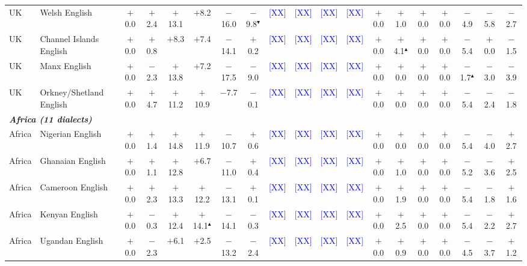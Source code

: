 \begin{table}[t]
\begin{tabular}{llccccccccccccccccc}
UK & Welsh English & $+$0.0 & $+$2.4 & $+$13.1 & $+$8.2 & $-$16.0 & $-$9.8$^\blacktriangledown$ & \textcolor{blue}{[XX]} & \textcolor{blue}{[XX]} & \textcolor{blue}{[XX]} & \textcolor{blue}{[XX]} & $+$0.0 & $+$1.0 & $+$0.0 & $+$0.0 & $-$4.9 & $-$5.8 & $-$2.7 \\
UK & Channel Islands English & $+$0.0 & $+$0.8 & $+$8.3 & $+$7.4 & $-$14.1 & $+$0.2 & \textcolor{blue}{[XX]} & \textcolor{blue}{[XX]} & \textcolor{blue}{[XX]} & \textcolor{blue}{[XX]} & $+$0.0 & $+$4.1$^\blacktriangle$ & $+$0.0 & $+$0.0 & $-$5.4 & $+$0.0 & $-$1.5 \\
UK & Manx English & $+$0.0 & $-$2.3 & $+$13.8 & $+$7.2 & $-$17.5 & $-$9.0 & \textcolor{blue}{[XX]} & \textcolor{blue}{[XX]} & \textcolor{blue}{[XX]} & \textcolor{blue}{[XX]} & $+$0.0 & $+$0.0 & $+$0.0 & $+$0.0 & $-$1.7$^\blacktriangle$ & $-$3.0 & $-$3.9 \\
UK & Orkney/Shetland English & $+$0.0 & $+$4.7 & $+$11.2 & $+$10.9 & $-$7.7 & $-$0.1 & \textcolor{blue}{[XX]} & \textcolor{blue}{[XX]} & \textcolor{blue}{[XX]} & \textcolor{blue}{[XX]} & $+$0.0 & $+$0.0 & $+$0.0 & $+$0.0 & $-$5.4 & $-$2.4 & $-$1.8 \\
\midrule
\multicolumn{19}{l}{\textit{\textbf{Africa (11 dialects)}}} \\
Africa & Nigerian English & $+$0.0 & $+$1.4 & $+$14.8 & $+$11.9 & $-$10.7 & $+$0.6 & \textcolor{blue}{[XX]} & \textcolor{blue}{[XX]} & \textcolor{blue}{[XX]} & \textcolor{blue}{[XX]} & $+$0.0 & $+$0.0 & $+$0.0 & $+$0.0 & $-$5.4 & $-$4.0 & $+$2.7 \\
Africa & Ghanaian English & $+$0.0 & $+$1.1 & $+$12.8 & $+$6.7 & $-$11.0 & $+$0.4 & \textcolor{blue}{[XX]} & \textcolor{blue}{[XX]} & \textcolor{blue}{[XX]} & \textcolor{blue}{[XX]} & $+$0.0 & $+$1.0 & $+$0.0 & $+$0.0 & $-$5.2 & $-$3.6 & $+$2.5 \\
Africa & Cameroon English & $+$0.0 & $+$2.3 & $+$13.3 & $+$12.2 & $-$13.1 & $+$0.1 & \textcolor{blue}{[XX]} & \textcolor{blue}{[XX]} & \textcolor{blue}{[XX]} & \textcolor{blue}{[XX]} & $+$0.0 & $+$1.9 & $+$0.0 & $+$0.0 & $-$5.4 & $-$1.8 & $+$1.6 \\
Africa & Kenyan English & $+$0.0 & $-$0.3 & $+$12.4 & $+$14.1$^\blacktriangle$ & $-$14.1 & $-$0.3 & \textcolor{blue}{[XX]} & \textcolor{blue}{[XX]} & \textcolor{blue}{[XX]} & \textcolor{blue}{[XX]} & $+$0.0 & $+$2.5 & $+$0.0 & $+$0.0 & $-$5.4 & $-$2.2 & $+$2.7 \\
Africa & Ugandan English & $+$0.0 & $-$2.3 & $+$6.1 & $+$2.5 & $-$13.2 & $-$2.4 & \textcolor{blue}{[XX]} & \textcolor{blue}{[XX]} & \textcolor{blue}{[XX]} & \textcolor{blue}{[XX]} & $+$0.0 & $+$0.9 & $+$0.0 & $+$0.0 & $-$4.5 & $-$3.7 & $+$1.2 \\

\end{tabular}
\end{table}
